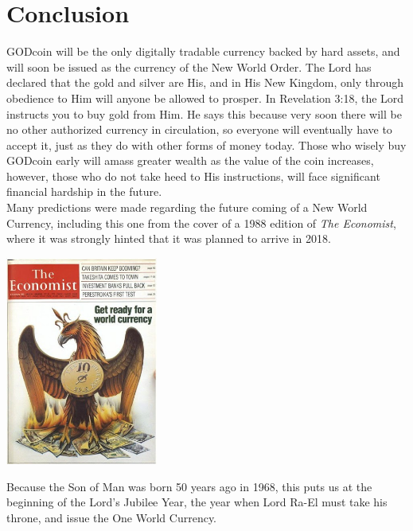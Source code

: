 \documentclass[12pt,a4paper]{article}
\begin{document}
  \newpage
  \section{Conclusion}
  GODcoin will be the only digitally tradable currency backed by hard assets,
  and will soon be issued as the currency of the New World Order. The Lord has
  declared that the gold and silver are His, and in His New Kingdom, only
  through obedience to Him will anyone be allowed to prosper. In Revelation
  3:18, the Lord instructs you to buy gold from Him. He says this because very
  soon there will be no other authorized currency in circulation, so everyone
  will eventually have to accept it, just as they do with other forms of money
  today. Those who wisely buy GODcoin early will amass greater wealth as the
  value of the coin increases, however, those who do not take heed to His
  instructions, will face significant financial hardship in the future.\\

  Many predictions were made regarding the future coming of a New World
  Currency, including this one from the cover of a 1988 edition of \textit{The
  Economist}\cite{the-economist}, where it was strongly hinted that it was
  planned to arrive in 2018.\\

  \begin{center}
    \includegraphics[width=50mm]{economist.png}\\
  \end{center}
  \vspace{3mm}

  Because the Son of Man was born 50 years ago in 1968, this puts us at the
  beginning of the Lord’s Jubilee Year, the year when Lord Ra-El must take his
  throne, and issue the One World Currency.\\
\end{document}
